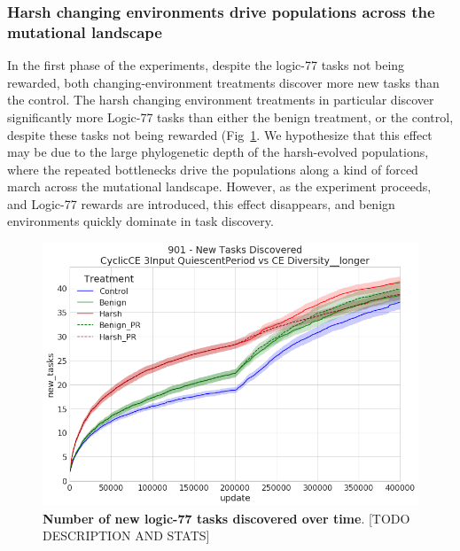 \documentclass[PhD]{msu-thesis}
\begin{document}
\subsubsection{Harsh changing environments drive populations across the mutational landscape}
In the first phase of the experiments, despite the logic-77 tasks not being rewarded, both changing-environment treatments discover more new tasks than the control. The harsh changing environment treatments in particular discover significantly more Logic-77 tasks than either the benign treatment, or the control, despite these tasks not being rewarded (Fig~\ref{fig:overall_task_discovery}. We hypothesize that this effect may be due to the large phylogenetic depth of the harsh-evolved populations, where the repeated bottlenecks drive the populations along a kind of forced march across the mutational landscape. However, as the experiment proceeds, and Logic-77 rewards are introduced, this effect disappears, and benign environments quickly dominate in task discovery.

	\begin{figure}[!h]
	\includegraphics[trim={0 0 0 0}, clip, width=0.75\columnwidth]{figures/LTE/901_overall_task_discovery.png}
	\caption{\textbf{Number of new logic-77 tasks discovered over time}. [TODO DESCRIPTION AND STATS]%
	}
	\label{fig:overall_task_discovery}
	\end{figure}

\end{document}
